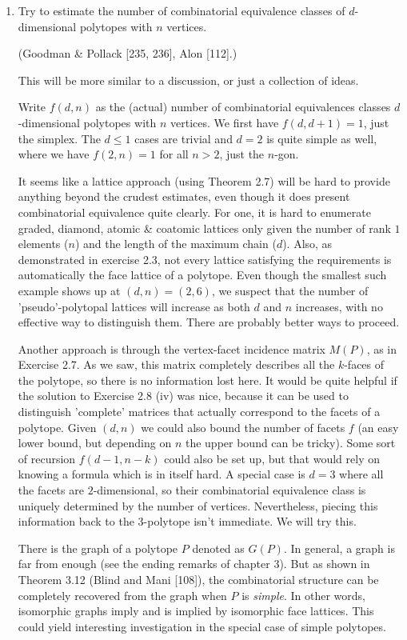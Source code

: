 \documentclass{article}
\begin{document}
\begin{enumerate}
\item Try to estimate the number of combinatorial equivalence classes of $d$-dimensional polytopes with $n$ vertices. 

(Goodman \& Pollack [235, 236], Alon [112].)

\begin{solution}
    This will be more similar to a discussion, or just a collection of ideas.

    Write $f(d, n)$ as the (actual) number of combinatorial equivalences classes $d$-dimensional polytopes with $n$ vertices. We first have $f(d, d+1) = 1$, just the simplex. The $d \leq 1$ cases are trivial and $d=2$ is quite simple as well, where we have $f(2, n) = 1$ for all $n > 2$, just the $n$-gon.

    It seems like a lattice approach (using Theorem 2.7) will be hard to provide anything beyond the crudest estimates, even though it does present combinatorial equivalence quite clearly. For one, it is hard to enumerate graded, diamond, atomic \& coatomic lattices only given the number of rank $1$ elements ($n$) and the length of the maximum chain ($d$). Also, as demonstrated in exercise 2.3, not every lattice satisfying the requirements is automatically the face lattice of a polytope. Even though the smallest such example shows up at $(d,n) = (2,6)$, we suspect that the number of 'pseudo'-polytopal lattices will increase as both $d$ and $n$ increases, with no effective way to distinguish them. There are probably better ways to proceed.

    Another approach is through the vertex-facet incidence matrix $M(P)$, as in Exercise 2.7. As we saw, this matrix completely describes all the $k$-faces of the polytope, so there is no information lost here. It would be quite helpful if the solution to Exercise 2.8 (iv) was nice, because it can be used to distinguish 'complete' matrices that actually correspond to the facets of a polytope. Given $(d,n)$ we could also bound the number of facets $f$ (an easy lower bound, but depending on $n$ the upper bound can be tricky). Some sort of recursion $f(d-1, n-k)$ could also be set up, but that would rely on knowing a formula which is in itself hard. A special case is $d=3$ where all the facets are $2$-dimensional, so their combinatorial equivalence class is uniquely determined by the number of vertices. Nevertheless, piecing this information back to the $3$-polytope isn't immediate. We will try this.

    There is the graph of a polytope $P$ denoted as $G(P)$. In general, a graph is far from enough (see the ending remarks of chapter 3). But as shown in Theorem 3.12 (Blind and Mani [108]), the combinatorial structure can be completely recovered from the graph when $P$ is \textit{simple}. In other words, isomorphic graphs imply and is implied by isomorphic face lattices. This could yield interesting investigation in the special case of simple polytopes.


\end{solution}
\end{enumerate}
\end{document}
